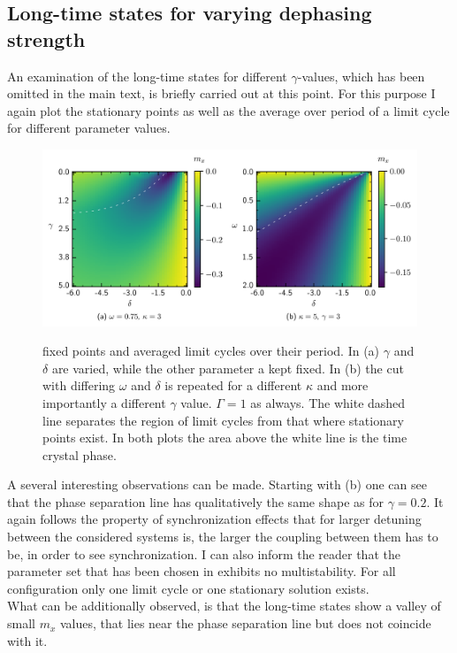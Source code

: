 \begin{appendices}
    \section{Long-time states for varying dephasing strength}\label{app:gamma_analysis}
    An examination of the long-time states for different $\gamma$-values, which has been omitted in the main text, is briefly carried out at this point. For this purpose I again plot the stationary points as well as the average over period of a limit cycle for different parameter values.
    \begin{figure}[H]
        \centering
        \caption{fixed points and averaged limit cycles over their period. In (a) $\gamma$ and $\delta$ are varied, while the other parameter a kept fixed. In (b) the cut with differing $\omega$ and $\delta$ is repeated for a different $\kappa$ and more importantly a different $\gamma$ value. $\Gamma=1$ as always. The white dashed line separates the region of limit cycles from that where stationary points exist. In both plots the area above the white line is the time crystal phase.}
        \includegraphics{pictures/limit_cycle_mean_gw.png}
        \label{fig:gamma_longtime}
    \end{figure}
    A several interesting observations can be made. Starting with (b) one can see that the phase separation line has qualitatively the same shape as for $\gamma=0.2$. It again follows the property of synchronization effects that for larger detuning between the considered systems is, the larger the coupling between them has to be, in order to see synchronization. I can also inform the reader that the parameter set that has been chosen in   exhibits no multistability. For all configuration only one limit cycle or one stationary solution exists. \\
    What can be additionally observed, is that the long-time states show a valley of small $m_x$ values, that lies near the phase separation line but does not coincide with it. \\\\

\end{appendices}
